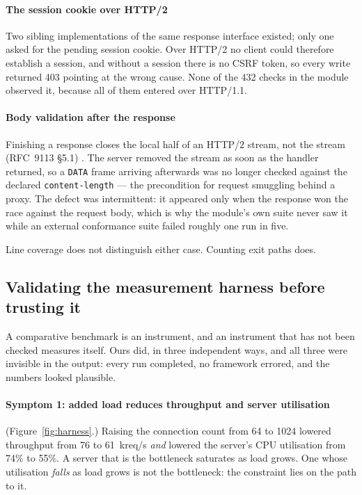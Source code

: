 \documentclass[preprint,12pt]{elsarticle}
\begin{document}
\paragraph{The session cookie over HTTP/2}
Two sibling implementations of the same response interface existed; only one
asked for the pending session cookie. Over HTTP/2 no client could therefore
establish a session, and without a session there is no CSRF token, so every
write returned 403 pointing at the wrong cause. None of the 432 checks in the
module observed it, because all of them entered over HTTP/1.1.

\paragraph{Body validation after the response}
Finishing a response closes the local half of an HTTP/2 stream, not the stream
(RFC~9113 §5.1) \cite{rfc9113}. The server removed the stream as soon as the handler returned,
so a \texttt{DATA} frame arriving afterwards was no longer checked against the
declared \texttt{content-length} --- the precondition for request smuggling
behind a proxy. The defect was intermittent: it appeared only when the response
won the race against the request body, which is why the module's own suite never
saw it while an external conformance suite failed roughly one run in five.

Line coverage does not distinguish either case. Counting exit paths does.

\subsection{Validating the measurement harness before trusting it}
\label{sec:harness}

A comparative benchmark is an instrument, and an instrument that has not been
checked measures itself. Ours did, in three independent ways, and all three were
invisible in the output: every run completed, no framework errored, and the
numbers looked plausible.

\paragraph{Symptom 1: added load reduces throughput and server utilisation}
(Figure~\ref{fig:harness}.)
Raising the connection count from 64 to 1024 lowered throughput from 76 to
61~kreq/s \emph{and} lowered the server's CPU utilisation from 74\% to 55\%.
A server that is the bottleneck saturates as load grows. One whose utilisation
\emph{falls} as load grows is not the bottleneck: the constraint lies on the
path to it.
\end{document}
